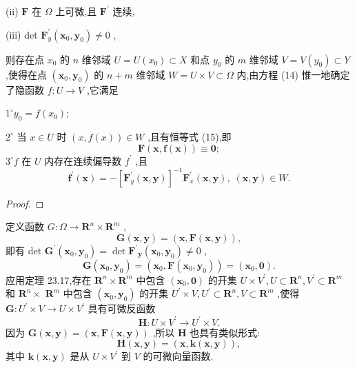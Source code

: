 (ii) \(\mathbf{F}\) 在 \(\Omega\) 上可微,且 \({\mathbf{F}}^{\prime }\) 连续,

(iii) det \({\mathbf{F}}_{y}^{\prime }\left( {{\mathbf{x}}_{0},{\mathbf{y}}_{0}}\right)  \neq  0\) ,

则存在点 \({x}_{0}\) 的 \(n\) 维邻域 \(U = U\left( {x}_{0}\right)  \subset  X\) 和点 \({y}_{0}\) 的 \(m\) 维邻域 \(V = V\left( {y}_{0}\right)  \subset  Y\) ,使得在点 \(\left( {{\mathbf{x}}_{0},{\mathbf{y}}_{0}}\right)\) 的 \(n + m\) 维邻域 \(W = U \times  V \subset  \Omega\) 内,由方程 (14) 惟一地确定了隐函数 \(f : U \rightarrow  V\) ,它满足

\({1}^{ \circ  }{y}_{0} = f\left( {x}_{0}\right) ;\)

\({2}^{ \circ  }\) 当 \(x \in  U\) 时 \(\left( {x,f\left( x\right) }\right)  \in  W\) ,且有恒等式 (15),即
\[
\mathbf{F}\left( {\mathbf{x},\mathbf{f}\left( \mathbf{x}\right) }\right)  \equiv  \mathbf{0};
\]
\({3}^{ \circ  }f\) 在 \(U\) 内存在连续偏导数 \({f}^{\prime }\) ,且
\[
{\mathbf{f}}^{\prime }\left( \mathbf{x}\right)  =  - {\left\lbrack  {\mathbf{F}}_{y}^{\prime }\left( \mathbf{x},\mathbf{y}\right) \right\rbrack  }^{-1}{\mathbf{F}}_{x}^{\prime }\left( {\mathbf{x},\mathbf{y}}\right) ,\;\left( {\mathbf{x},\mathbf{y}}\right)  \in  W. \tag{18}
\]
\begin{proof}

\end{proof}
定义函数 \(G : \Omega  \rightarrow  {\mathbf{R}}^{n} \times  {\mathbf{R}}^{m}\) ,
\[
\mathbf{G}\left( {\mathbf{x},\mathbf{y}}\right)  = \left( {\mathbf{x},\mathbf{F}\left( {\mathbf{x},\mathbf{y}}\right) }\right) ,
\]
即有 det \({\mathbf{G}}^{\prime }\left( {{\mathbf{x}}_{0},{\mathbf{y}}_{0}}\right)  = \det {\mathbf{F}}^{\prime }{}_{\mathbf{y}}\left( {{\mathbf{x}}_{0},{\mathbf{y}}_{0}}\right)  \neq  0\) ,
\[
\mathbf{G}\left( {{\mathbf{x}}_{0},{\mathbf{y}}_{0}}\right)  = \left( {{\mathbf{x}}_{0},\mathbf{F}\left( {{\mathbf{x}}_{0},{\mathbf{y}}_{0}}\right) }\right)  = \left( {{\mathbf{x}}_{0},\mathbf{0}}\right) .
\]
应用定理 23.17,存在 \({\mathbf{R}}^{n} \times  {\mathbf{R}}^{m}\) 中包含 \(\left( {{\mathbf{x}}_{0},\mathbf{0}}\right)\) 的开集 \(U \times  {V}^{\prime },U \subset  {\mathbf{R}}^{n},{V}^{\prime } \subset  {\mathbf{R}}^{m}\) 和 \({\mathbf{R}}^{n} \times\)  \({\mathbf{R}}^{m}\) 中包含 \(\left( {{\mathbf{x}}_{0},{\mathbf{y}}_{0}}\right)\) 的开集 \({U}^{\prime } \times  V,{U}^{\prime } \subset  {\mathbf{R}}^{n},V \subset  {\mathbf{R}}^{m}\) ,使得 \(\mathbf{G} : {U}^{\prime } \times  V \rightarrow  U \times  {V}^{\prime }\) 具有可微反函数
\[
\mathbf{H} : U \times  {V}^{\prime } \rightarrow  {U}^{\prime } \times  V. \tag{19}
\]
因为 \(\mathbf{G}\left( {\mathbf{x},\mathbf{y}}\right)  = \left( {\mathbf{x},\mathbf{F}\left( {\mathbf{x},\mathbf{y}}\right) }\right)\) ,所以 \(\mathbf{H}\) 也具有类似形式:
\[
\mathbf{H}\left( {\mathbf{x},\mathbf{y}}\right)  = \left( {\mathbf{x},\mathbf{k}\left( {\mathbf{x},\mathbf{y}}\right) }\right) , \tag{20}
\]
其中 \(\mathbf{k}\left( {\mathbf{x},\mathbf{y}}\right)\) 是从 \(U \times  {V}^{\prime }\) 到 \(V\) 的可微向量函数.

